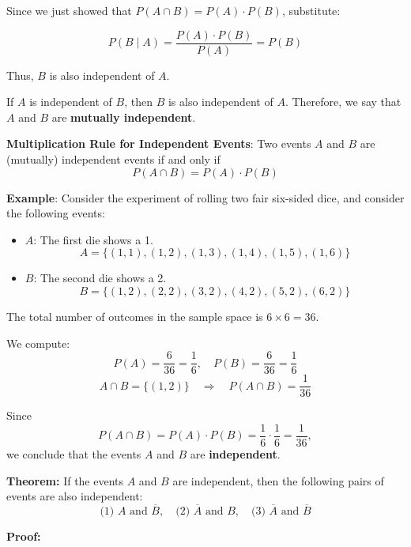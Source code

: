 \documentclass[twoside]{book}
\begin{document}
Since we just showed that $P(A \cap B) = P(A) \cdot P(B)$, substitute:

$$
P(B \mid A) = \frac{P(A) \cdot P(B)}{P(A)} = P(B)
$$

Thus, $B$ is also independent of $A$.

\begin{textbox}
If \( A \) is independent of \( B \), then \( B \) is also independent of \( A \). Therefore, we say that \( A \) and \( B \) are \textbf{mutually independent}.
\end{textbox}

\begin{textbox}
\textbf{Multiplication Rule for Independent Events}: Two events $A$ and $B$ are (mutually) independent events if and only if
$$P( A \cap B ) = P( A ) \cdot P( B )$$
\end{textbox}

\textbf{Example}: Consider the experiment of rolling two fair six-sided dice, and consider the following events:
\begin{itemize}
    \item \( A \): The first die shows a 1.
    \[ A = \{(1,1), (1,2), (1,3), (1,4), (1,5), (1,6)\} \]
    \item \( B \): The second die shows a 2.
    \[ B = \{(1,2), (2,2), (3,2), (4,2), (5,2), (6,2)\} \]
\end{itemize}

The total number of outcomes in the sample space is \( 6 \times 6 = 36 \).

We compute:
\[
P(A) = \frac{6}{36} = \frac{1}{6}, \quad P(B) = \frac{6}{36} = \frac{1}{6}
\]
\[
A \cap B = \{(1,2)\} \quad \Rightarrow \quad P(A \cap B) = \frac{1}{36}
\]

Since
\[
P(A \cap B) = P(A) \cdot P(B) = \frac{1}{6} \cdot \frac{1}{6} = \frac{1}{36},
\]
we conclude that the events \( A \) and \( B \) are \textbf{independent}.

\begin{textbox}
\textbf{Theorem:}
If the events \( A \) and \( B \) are independent, then the following pairs of events are also independent:
\[
\text{(1) } A \text{ and } \overline{B}, \quad \text{(2) } \overline{A} \text{ and } B, \quad \text{(3) } \overline{A} \text{ and } \overline{B}
\]
\end{textbox}
\textbf{Proof:}
\end{document}

